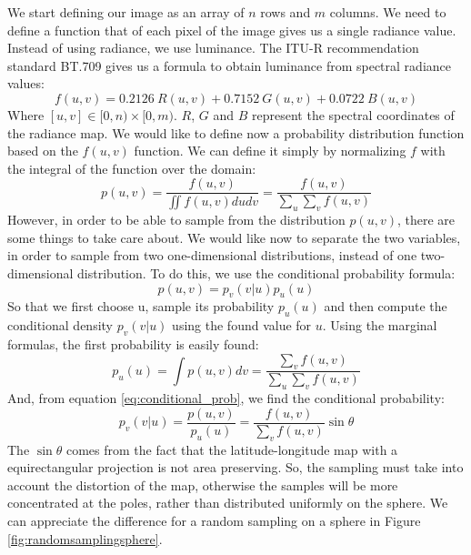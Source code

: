We start defining our image as an array of $n$ rows and $m$ columns. We need to define a function that of each pixel of the image gives us a single radiance value. Instead of using radiance, we use luminance. The ITU-R recommendation standard BT.709 \citep{BT.709-2} gives us a formula to obtain luminance from spectral radiance values:
$$
f(u,v) = 0.2126\ R(u,v) + 0.7152\ G(u,v) + 0.0722\ B(u,v)
$$
Where $[u,v] \in [0,n)\times [0,m)$. $R$, $G$ and $B$ represent the spectral coordinates of the radiance map. We would like to define now a probability distribution function based on the $f(u,v)$ function. We can define it simply by normalizing $f$ with the integral of the function over the domain:
$$
p(u,v) = \frac{f(u,v)}{ \displaystyle\iint f(u,v) du dv} = \frac{f(u,v)}{ \displaystyle\sum_u \sum_v f(u,v)}
$$
However, in order to be able to sample from the distribution $p(u,v)$, there are some things to take care about. We would like now to separate the two variables, in order to sample from two one-dimensional distributions, instead of one two-dimensional distribution. To do this, we use the conditional probability formula:
$$
p(u,v) = p_v(v|u) p_u(u)
\label{eq:conditional_prob}
$$
So that we first choose u, sample its probability $p_u(u)$ and then compute the conditional density $p_v(v|u)$ using the found value for $u$. Using the marginal formulas, the first probability is easily found:
$$
p_u(u) =\int p(u,v) dv = \frac{ \displaystyle\sum_v f(u,v)}{ \displaystyle\sum_u \sum_v f(u,v)}
$$
And, from equation \ref{eq:conditional_prob}, we find the conditional probability:
$$
p_v(v|u) = \frac{p(u,v)}{p_u(u)} = \frac{f(u,v)}{ \displaystyle\sum_v f(u,v)} \sin \theta
$$
The $\sin \theta$ comes from the fact that the latitude-longitude map with a equirectangular projection is not area preserving. So, the sampling must take into account the distortion of the map, otherwise the samples will be more concentrated at the poles, rather than distributed uniformly on the sphere. We can appreciate the difference for a random sampling on a sphere in Figure \ref{fig:randomsamplingsphere}.
